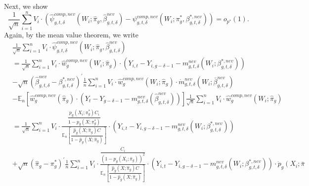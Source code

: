 \documentclass[11pt]{article}%
\theoremstyle{plain}
\numberwithin{sassumption}{section}
\numberwithin{equation}{section}
\begin{document}
{\small Next, we show%
\begin{equation}
\frac{1}{\sqrt{n}}\sum_{i=1}^{n}V_{i}\cdot\left(  \widehat{\psi}_{g,t,\delta
}^{comp,nev}(W_{i};\widehat{\pi}_{g},\widehat{\beta}_{g,t,\delta}^{nev}%
)-\psi_{g,t,\delta}^{comp,nev}(W_{i};\pi_{g}^{\ast},\beta_{g,t,\delta}%
^{\ast,nev})\right)  =o_{p^{\ast}}\left(  1\right)  . \label{boot:comp}%
\end{equation}
Again, by the mean value theorem, we write
\begin{align*}
&  \frac{1}{\sqrt{n}}\sum_{i=1}^{n}V_{i}\cdot\widehat{\psi}_{g,t,\delta
}^{comp,nev}(W_{i};\widehat{\pi}_{g},\widehat{\beta}_{g,t,\delta}^{nev})\\
&  =\frac{1}{\sqrt{n}}\sum_{i=1}^{n}V_{i}\cdot\widehat{w}_{g}^{comp,nev}%
\left(  W_{i};\widehat{\pi}_{g}\right)  \cdot\left(  Y_{i,t}-Y_{i,g-\delta
-1}-m_{g,t,\delta}^{nev}\left(  W_{i};\beta_{g,t,\delta}^{\ast,nev}\right)
\right) \\
&  -\sqrt{n}\left(  \widehat{\beta}_{g,t,\delta}^{nev}-\beta_{g,t,\delta
}^{\ast,nev}\right)  ^{\prime}\frac{1}{n}\sum_{i=1}^{n}V_{i}\cdot
\widehat{w}_{g}^{comp,nev}\left(  W_{i};\widehat{\pi}_{g}\right)  \cdot\dot
{m}_{g,t,\delta}^{nev}\left(  W_{i};\bar{\beta}_{g,t,\delta}^{nev}\right) \\
&  -\mathbb{E}_{n}\left[  \widehat{w}_{g}^{comp,nev}\left(  \widehat{\pi}%
_{g}\right)  \cdot\left(  Y_{t}-Y_{g-\delta-1}-m_{g,t,\delta}^{nev}\left(
\widehat{\beta}_{g,t,\delta}^{nev}\right)  \right)  \right]  \frac{1}{\sqrt
{n}}\sum_{i=1}^{n}V_{i}\cdot\widehat{w}_{g}^{comp,nev}\left(  W_{i}%
;\widehat{\pi}_{g}\right) \\
&  =\frac{1}{\sqrt{n}}\sum_{i=1}^{n}V_{i}\cdot\frac{\dfrac{p_{g}\left(
X_{i};\pi_{g}^{\ast}\right)  C_{i}}{1-p_{g}\left(  X;\pi_{g}^{\ast}\right)  }%
}{\mathbb{E}_{n}\left[  \dfrac{\widehat{p}_{g}\left(  X;\widehat{\pi}%
_{g}\right)  C}{1-\widehat{p}_{g}\left(  X;\widehat{\pi}_{g}\right)  }\right]
}\cdot\left(  Y_{i,t}-Y_{i,g-\delta-1}-m_{g,t,\delta}^{nev}\left(  W_{i}%
;\beta_{g,t,\delta}^{\ast,nev}\right)  \right) \\
&  +\sqrt{n}\left(  \widehat{\pi}_{g}-\pi_{g}^{\ast}\right)  ^{\prime}\frac
{1}{n}\sum_{i=1}^{n}V_{i}\cdot\frac{\dfrac{C_{i}}{\left(  1-p_{g}\left(
X_{i};\bar{\pi}_{g}\right)  \right)  ^{2}}}{\mathbb{E}_{n}\left[
\dfrac{\widehat{p}_{g}\left(  X;\widehat{\pi}_{g}\right)  C}{1-\widehat{p}%
_{g}\left(  X;\widehat{\pi}_{g}\right)  }\right]  }\cdot\left(  Y_{i,t}%
-Y_{i,g-\delta-1}-m_{g,t,\delta}^{nev}\left(  W_{i};\beta_{g,t,\delta}%
^{\ast,nev}\right)  \right)  \cdot\dot{p}_{g}\left(  X_{i};\bar{\pi}%

\end{align*}}
\end{document}
